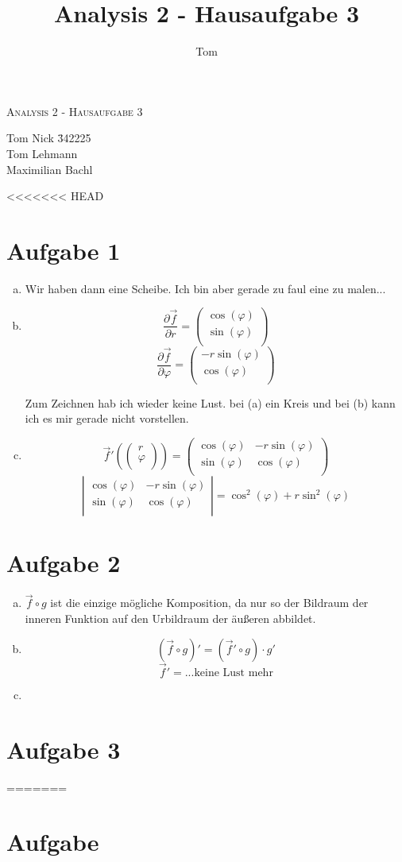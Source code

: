 \documentclass[10pt,a4paper,parskip=half]{scrartcl}
\author{Tom}
\title{Analysis 2 - Hausaufgabe 3}
\newcommand{\vectwo}[2]{\left(\begin {array} {c}#1\\#2\\\end {array} \right)}
\newcommand{\mattwotwo}[4]{\left(\begin {array} {cc}#1 & #3\\#2 & #4\\\end {array} \right)}
\newcommand{\dettwotwo}[4]{\left|\begin {array} {cc}#1 & #3\\#2 & #4\\\end {array} \right|}
\begin{document}
\begin{center}
\textsc{\Large{Analysis 2 - Hausaufgabe 3}} \\
\end{center}
\begin{tabbing}
Tom Nick \hspace{1.4cm}\= 342225\\
Tom Lehmann\\
Maximilian Bachl
\end{tabbing}
<<<<<<< HEAD
\section*{Aufgabe 1}
\begin{enumerate}[(a)]
\item
Wir haben dann eine Scheibe. Ich bin aber gerade zu faul eine zu malen...
\item
$$ \frac{\partial \vec f}{\partial r} = \vectwo{\cos(\varphi)}{\sin(\varphi)}$$
$$ \frac{\partial \vec f}{\partial \varphi} = \vectwo{-r\sin(\varphi)}{\cos(\varphi)}$$

Zum Zeichnen hab ich wieder keine Lust. bei (a) ein Kreis und bei (b) kann ich es mir gerade nicht vorstellen.
\item
$$ \vec f'(\vectwo{r}{\varphi}) = \mattwotwo{\cos(\varphi)}{\sin(\varphi)}{-r\sin(\varphi)}{\cos(\varphi)} $$
$$\dettwotwo{\cos(\varphi)}{\sin(\varphi)}{-r\sin(\varphi)}{\cos(\varphi)} = \cos^2(\varphi) + r\sin^2(\varphi)$$
\end{enumerate}
\section*{Aufgabe 2}
\begin{enumerate}[(a)]
\item
$\vec f \circ g$ ist die einzige mögliche Komposition, da nur so der Bildraum der inneren Funktion auf den Urbildraum der äußeren abbildet.
\item
$$ (\vec f \circ g)' = (\vec f' \circ g) \cdot g'$$
$$ \vec f' = ... \text{keine Lust mehr} $$
\item
\end{enumerate}
\section*{Aufgabe 3}
=======
\section{Aufgabe}
\end{document}
